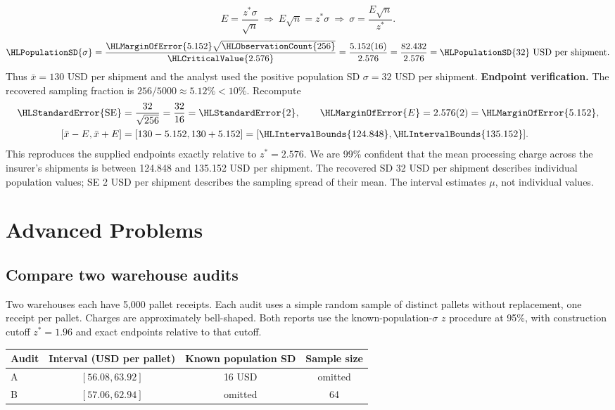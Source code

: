 \[E=\frac{z^*\sigma}{\sqrt n}\ \Longrightarrow\ E\sqrt n=z^*\sigma\ \Longrightarrow\ \sigma=\frac{E\sqrt n}{z^*}.\]
\[\HLPopulationSD{\sigma}=\frac{\HLMarginOfError{5.152}\sqrt{\HLObservationCount{256}}}{\HLCriticalValue{2.576}}=\frac{5.152(16)}{2.576}=\frac{82.432}{2.576}=\HLPopulationSD{32}\text{ USD per shipment}.\]
Thus $\bar x=130$ USD per shipment and the analyst used the positive population SD $\sigma=32$ USD per shipment.
\textbf{Endpoint verification.} The recovered sampling fraction is $256/5000\approx 5.12\%<10\%$. Recompute
\[\begin{aligned}
\HLStandardError{\mathrm{SE}}&=\frac{32}{\sqrt{256}}=\frac{32}{16}=\HLStandardError{2},\qquad \HLMarginOfError{E}=2.576(2)=\HLMarginOfError{5.152},\\
[\bar x-E,\bar x+E]&=[130-5.152,130+5.152]=[\HLIntervalBounds{124.848},\HLIntervalBounds{135.152}].
\end{aligned}\]
This reproduces the supplied endpoints exactly relative to $z^*=2.576$. We are 99\% confident that the mean processing charge across the insurer's shipments is between 124.848 and 135.152 USD per shipment.
The recovered SD 32 USD per shipment describes individual population values; SE 2 USD per shipment describes the sampling spread of their mean. The interval estimates $\mu$, not individual values.

\clearpage
{}
\section{Advanced Problems}\label{sec:advanced}
\subsection{Compare two warehouse audits}\label{prob:c4-advanced-1}
Two warehouses each have 5,000 pallet receipts. Each audit uses a simple random sample of distinct pallets without replacement, one receipt per pallet. Charges are approximately bell-shaped. Both reports use the known-population-$\sigma$ $z$ procedure at 95\%, with construction cutoff $z^*=1.96$ and exact endpoints relative to that cutoff.
\begin{center}
\begin{tabular}{@{}lccc@{}}\toprule
Audit&Interval (USD per pallet)&Known population SD&Sample size\\\midrule
A&$[56.08,63.92]$&16 USD&omitted\\
B&$[57.06,62.94]$&omitted&64\\\bottomrule
\end{tabular}
\end{center}
